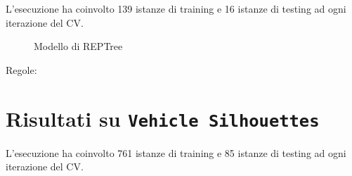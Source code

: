 \normalsize L'esecuzione ha coinvolto 139 istanze di training e 16 istanze di testing ad ogni iterazione del CV.

\begin{mdframed}[frametitle=Esecuzione NaiveBayesSimple]
	\footnotesize
\end{mdframed}


\scriptsize

\begin{mdframed}[frametitle=Esecuzione REPTree]
	\footnotesize
\end{mdframed}


\begin{figure}[htb]
	\caption{Modello di REPTree}
\end{figure}

\begin{mdframed}[frametitle=Esecuzione JRip]
	\footnotesize
\end{mdframed}


\noindent
\normalsize Regole:
\footnotesize

\pagebreak

\section{Risultati su \texttt{Vehicle Silhouettes}}

\normalsize L'esecuzione ha coinvolto 761 istanze di training e 85 istanze di testing ad ogni iterazione del CV.

\begin{mdframed}[frametitle=Esecuzione NaiveBayesSimple]
	\footnotesize
\end{mdframed}


